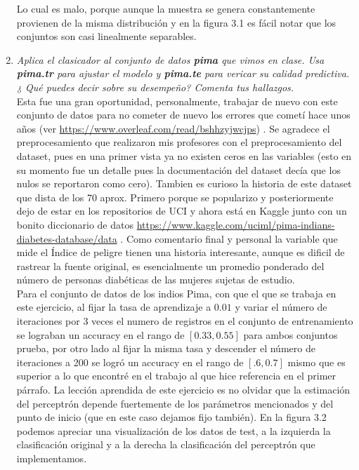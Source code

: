 \documentclass[paper=letter, fontsize=11pt]{scrartcl}
\numberwithin{equation}{section} %
\numberwithin{figure}{section} %
\numberwithin{table}{section} %
\begin{document}
\begin{enumerate}
Lo cual es malo, porque aunque la muestra se genera constantemente provienen de la misma distribución y en la figura 3.1 es fácil notar que los conjuntos son casi linealmente separables.

 
\item \textit{Aplica el clasicador al conjunto de datos \textbf{pima} que vimos en clase. Usa \textbf{pima.tr} para ajustar el modelo y \textbf{pima.te} para vericar su calidad predictiva. ¿ Qué puedes decir sobre su desempeño? Comenta tus hallazgos.}\\

Esta fue una gran oportunidad, personalmente, trabajar de nuevo con este conjunto de datos para no cometer de nuevo los errores que cometí hace unos años (ver \url{ https://www.overleaf.com/read/bshhzyjwcjps}) . Se agradece el preprocesamiento que realizaron mis profesores con el preprocesamiento del dataset, pues en una primer vista ya no existen ceros en las variables (esto en su momento fue un detalle pues la documentación del dataset decía que los nulos se reportaron como cero). Tambien es curioso la historia de este dataset que dista de los 70 aprox. Primero porque se popularizo y posteriormente dejo de estar en los repositorios de UCI y ahora está en Kaggle junto con un bonito diccionario de datos \url{ https://www.kaggle.com/uciml/pima-indians-diabetes-database/data} . Como comentario final y personal la variable que mide el Índice de peligre tienen una historia interesante, aunque es dificil de rastrear la fuente original, es esencialmente un promedio ponderado del número de personas diabéticas de las mujeres sujetas de estudio.\\

Para el conjunto de datos de los indios Pima, con que el que se trabaja en este ejercicio, al fijar la tasa de aprendizaje a $0.01$ y variar el número de iteraciones por 3 veces el numero de registros en el conjunto de entrenamiento se lograban un accuracy en el rango de $[0.33, 0.55]$ para ambos conjuntos prueba, por otro lado al fijar la misma tasa y descender el número de iteraciones a 200 se logró un accuracy en el rango de $[.6,0.7]$ mismo que es superior a lo que encontré en el trabajo al que hice referencia en el primer párrafo. La lección aprendida de este ejercicio es no olvidar que la estimación del perceptrón depende fuertemente de los parámetros mencionados y del punto de inicio (que en este caso dejamos fijo también). En la figura 3.2 podemos apreciar una visualización de los datos de test, a la izquierda la clasificación original y a la derecha la clasificación del perceptrón que implementamos.
    


\end{enumerate}
\end{document}
